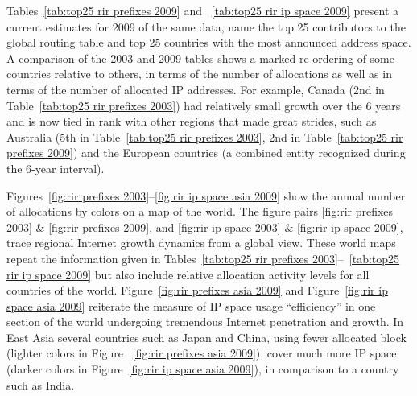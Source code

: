 Tables~\ref{tab:top25 rir prefixes 2009} and ~\ref{tab:top25 rir ip space
2009} present a current estimates for 2009 of the same data, name the 
top 25 contributors to the global routing table and top 25 countries with 
the most announced address space. A comparison of the 2003 and 2009 tables 
shows a marked re-ordering of some countries relative to others, in terms 
of the number of allocations as well as in terms of the number of allocated 
IP addresses. For example, Canada (2nd in 
Table~\ref{tab:top25 rir prefixes 2003}) had relatively small growth over 
the 6 years and is now tied in rank with other regions that made great strides, 
such as Australia (5th in Table~\ref{tab:top25 rir prefixes 2003}, 
2nd in Table~\ref{tab:top25 rir prefixes 2009}) and the European countries 
(a combined entity recognized during the 6-year interval).

Figures~\ref{fig:rir prefixes 2003}--\ref{fig:rir ip space asia 2009} show the
annual number of allocations by colors on a map of the world. The figure pairs 
\ref{fig:rir prefixes 2003} & \ref{fig:rir prefixes 2009}, and 
\ref{fig:rir ip space 2003} & \ref{fig:rir ip space 2009}, trace regional Internet 
growth dynamics from a global view.  These world maps repeat the information given 
in Tables~\ref{tab:top25 rir prefixes 2003}--~\ref{tab:top25 rir ip space
2009} but also include relative allocation activity levels for all countries of 
the world.  Figure~\ref{fig:rir prefixes asia 2009} and 
Figure~\ref{fig:rir ip space asia 2009} reiterate the measure of IP space usage
``efficiency'' in one section of the world undergoing tremendous Internet penetration 
and growth.  In East Asia several countries such as Japan and China, using fewer allocated 
block (lighter colors in Figure ~\ref{fig:rir prefixes asia 2009}), 
cover much more IP space (darker colors in Figure~\ref{fig:rir ip space asia 2009}), 
in comparison to a country such as India.



